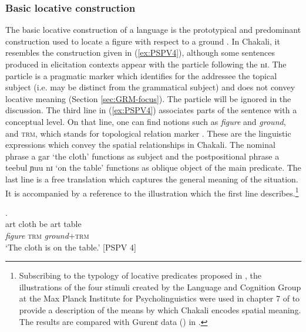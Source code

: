 % 

\subsubsection{Basic locative construction}
\label{sec:SPA-blc}


The  basic locative construction  of a language 
is  the prototypical  and predominant construction used to locate a figure with 
respect to a ground \citep[15]{Levi06}. In Chakali, it resembles the 
construction given in (\ref{ex:PSPV4}), although some sentences produced in 
elicitation contexts appear with the  particle following the 
 {\sls nɪ}.  The  particle  is a pragmatic 
marker which identifies for the addressee the topical subject (i.e. may be 
distinct from the grammatical subject) and does not convey locative meaning 
(Section \ref{sec:GRM-focus}). The  particle will be ignored in the 
discussion. The third  line  in (\ref{ex:PSPV4}) associates parts of the 
sentence with a conceptual level. On that line, one can find notions such as 
{\it figure} and {\it ground},  and \textsc{trm}, which stands for 
 topological relation marker 
\citep[see][]{Brin12}. These are the linguistic expressions which convey  the 
spatial relationships in Chakali.  The nominal phrase {\sls a gar} `the cloth'  
functions as subject and the postpositional phrase {\sls a teebul ɲuu nɪ} `on the table' 
functions as  oblique object  of the main predicate. The last line is a free 
translation which captures  the general meaning of the situation. It is 
accompanied by a reference to the illustration which the first line 
describes.\footnote{Subscribing to the typology of locative predicates proposed in \citet{amek07b}, the illustrations of the  four stimuli created by the Language and Cognition Group at the Max Planck Institute for Psycholinguistics \citep{bowe93, amek99, meir01a, meir01b} were used in chapter 7 of \citet{brin11} to provide a description of the means by which Chakali encodes spatial
meaning. The results are compared with Gurenɛ data () in \citet{Brin12}.}



\begin{exe}
\ex\label{ex:PSPV4}
\glll  [à gár] [ságá] [à {téébùl ɲúù} nɪ̀].\\
{\sc art} cloth be {\sc art}  {table {\reln}}  {\postp}\\
 \textit{figure} {} \textsc{trm}  {} {\textit{ground}+\textsc{trm}}  {} \\
\glt `The cloth is on the table.' [PSPV 4]
\end{exe}


